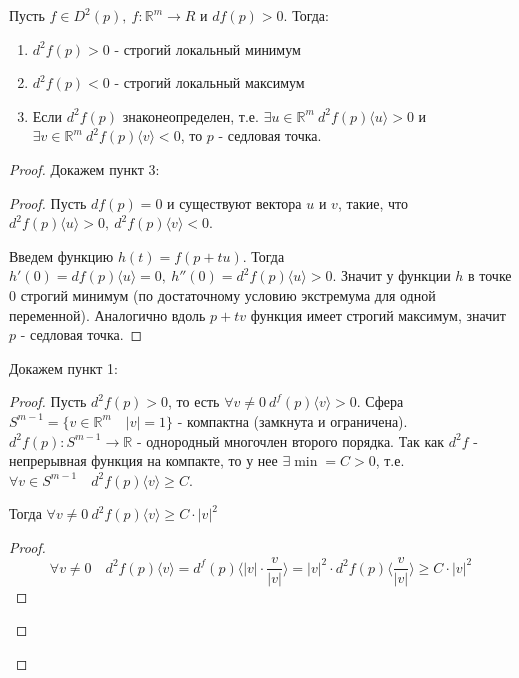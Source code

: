 \begin{theorem}    
    Пусть $f \in D^2(p), \ f:\mathbb{R}^m \to R$ и $df(p) > 0$. Тогда:
    \begin{enumerate}
        \item $d^2f(p) > 0$ - строгий локальный минимум
        \item $d^2f(p) < 0$ - строгий локальный максимум
        \item Если $d^2f(p)$ знаконеопределен, т.е. $\exists u \in \mathbb{R}^m \ d^2f(p)\langle u \rangle > 0$ и $\exists v \in \mathbb{R}^m \ d^2f(p)\langle v \rangle < 0$, то $p$ - седловая точка.
    \end{enumerate}
    \begin{proof}
        
        Докажем пункт 3:
        \begin{proof}
            Пусть $df(p) = 0$ и существуют вектора $u$ и $v$, такие, что $d^2f(p)\langle u \rangle > 0, \ d^2f(p)\langle v \rangle < 0$.
            
            Введем функцию $h(t) = f(p + tu)$. Тогда $h'(0) = df(p)\langle u \rangle = 0, \  h''(0) = d^2f(p)\langle u \rangle > 0$. Значит у функции $h$ в точке $0$ строгий минимум 
            (по достаточному условию экстремума для одной переменной). Аналогично вдоль $p + tv$ функция имеет строгий максимум, значит $p$ - седловая точка.
        \end{proof}
        
        Докажем пункт 1:
        \begin{proof}
            Пусть $d^2f(p) > 0$, то есть $\forall v \neq 0 \ d^f(p)\langle v \rangle > 0$. Сфера $S^{m-1} = \{v \in \mathbb{R}^m \quad \left| v \right| = 1\}$ - компактна (замкнута и ограничена). $d^2f(p):S^{m-1} \to \mathbb{R}$ - однородный многочлен второго порядка.
            Так как $d^2f$ - непрерывная функция на компакте, то у нее $\exists \min = C > 0$, т.е.\\ $\forall v \in S^{m-1} \quad d^2f(p)\langle v \rangle \geq C$.
            \begin{statement*}
                Тогда $\forall v \neq 0 \ d^2f(p)\langle v \rangle \geq C\cdot \left| v \right|^2$
                \begin{proof}
                    \[\forall v \neq 0 \quad d^2f(p)\langle v \rangle = d^f(p)\langle \left| v \right| \cdot \frac{v}{\left| v \right|} \rangle = 
                    \left| v \right|^2\cdot d^2f(p)\langle \frac{v}{\left| v \right|} \rangle \geq C\cdot \left| v \right|^2\]
                \end{proof}
            \end{statement*}


\end{proof}
\end{proof}
\end{theorem}
